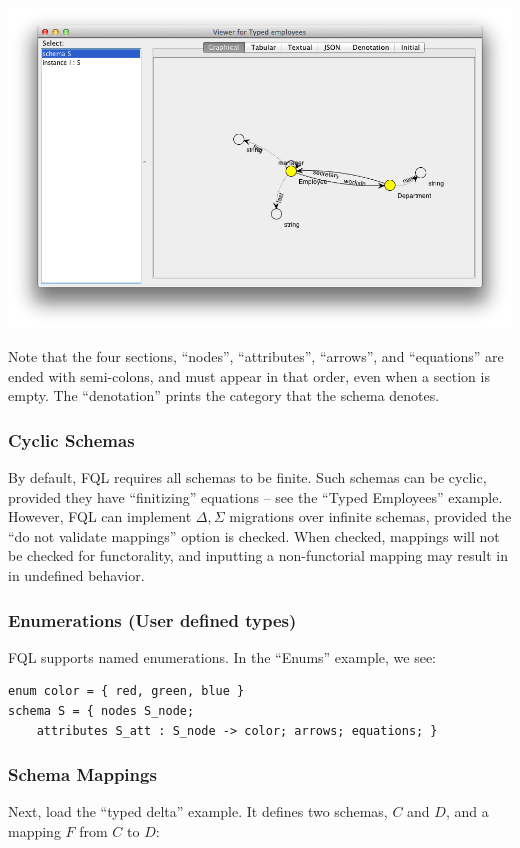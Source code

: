 \documentclass[12pt]{article}
\begin{document}
\begin{center}
\includegraphics[width=6in]{schema}
\end{center}

Note that the four sections, ``nodes'', ``attributes'', ``arrows'', and ``equations'' are ended with semi-colons, and must appear in that order, even when a section is empty.  The ``denotation'' prints the category that the schema denotes.

\subsubsection{Cyclic Schemas}

By default, FQL requires all schemas to be finite.  Such schemas can be cyclic, provided they have ``finitizing'' equations -- see the ``Typed Employees'' example.   However, FQL can implement $\Delta,\Sigma$ migrations over infinite schemas, provided the ``do not validate mappings'' option is checked.  When checked, mappings will not be checked for functorality, and inputting a non-functorial mapping may result in in undefined behavior.  

\subsubsection{Enumerations (User defined types)}
FQL supports named enumerations.  In the ``Enums'' example, we see:
\begin{verbatim}
enum color = { red, green, blue }
schema S = { nodes S_node;
	attributes S_att : S_node -> color; arrows; equations; }
\end{verbatim}

\subsubsection{Schema Mappings}
Next, load the ``typed delta'' example.  It defines two schemas, $C$ and $D$, and a mapping $F$ from $C$ to $D$:
\end{document}
